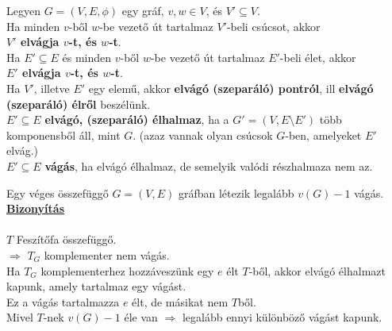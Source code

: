 \begin{frame}
\begin{tcolorbox}[title={Elvágó élhalmaz, vágás}]
Legyen $G =  (V, E, {\phi})$ egy gráf, $v, w \in V$, és $V' \subseteq V$.\\
\mbigskip
Ha minden $v$-ből $w$-be vezető út tartalmaz $V'$-beli csúcsot, akkor\\
\mmedskip
\textbf{$V'$ elvágja $v$-t, és $w$-t}.\\
\mmedskip
Ha $E' \subseteq E$ és minden $v$-ből $w$-be vezető út tartalmaz $E'$-beli élet, akkor\\
\mmedskip
\textbf{$E'$ elvágja $v$-t, és $w$-t}.\\
\mbigskip
Ha $V'$, illetve $E'$ egy elemű, akkor \textbf{elvágó (szeparáló) pontról}, ill \textbf{elvágó (szeparáló) élről} beszélünk.\\
\mbigskip
$E' \subseteq E$ \textbf{elvágó, (szeparáló) élhalmaz}, ha a $G' = (V, E \setminus E')$ több komponensből áll, mint $G$. (azaz vannak olyan csúcsok $G$-ben, amelyeket $E'$ elvág.)\\
\mbigskip
$E' \subseteq E$ \textbf{vágás}, ha elvágó élhalmaz, de semelyik  valódi részhalmaza nem az.
\end{tcolorbox}
\end{frame}

\begin{frame}
\begin{tcolorbox}[title={Tétel: Vágások száma}]
Egy véges összefüggő $G = (V, E)$ gráfban létezik legalább $v(G) - 1$ vágás.\\
\tcblower
\msmallskip
\underline{\textbf{Bizonyítás}}\\
\mmedskip
\\
$T$ Feszítőfa összefüggő.\\
$\Rightarrow$ $T_G$ komplementer nem vágás.\\
Ha $T_G$ komplementerhez hozzáveszünk egy $e$ élt $T$-ből, akkor elvágó élhalmazt kapunk, amely tartalmaz egy vágást.\\
Ez a vágás tartalmazza $e$ élt, de másikat nem $T$ből.\\
Mivel $T$-nek $v(G) - 1$ éle van $\Rightarrow$ legalább ennyi különböző vágást kapunk.
\end{tcolorbox}
\end{frame}

